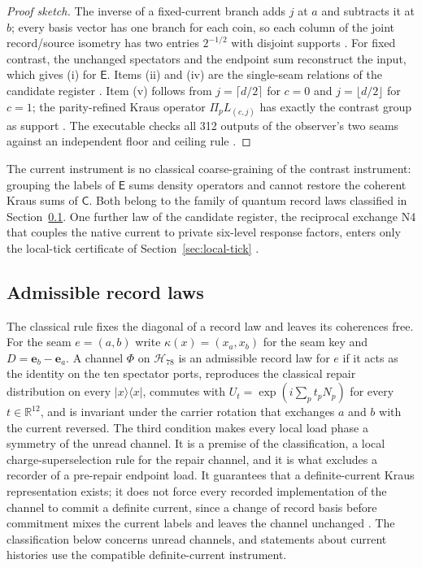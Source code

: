 \documentclass[11pt]{article}
\theoremstyle{definition}
\theoremstyle{remark}
\theoremstyle{plain}
\newcommand{\proj}[1]{\lvert #1\rangle\langle #1\rvert}
\newcommand{\Cn}{\mathsf{C}}
\newcommand{\En}{\mathsf{E}}
\newcommand{\Hil}{\mathcal{H}}
\begin{document}
\begin{proof}[Proof sketch]
The inverse of a fixed-current branch adds $j$ at $a$ and subtracts it at
$b$; every basis vector has one branch for each coin, so each column of the
joint record/source isometry has two entries $2^{-1/2}$ with disjoint
supports \cite{oDERIV}. For fixed contrast, the unchanged spectators and the
endpoint sum reconstruct the input, which gives (i) for $\En$. Items (ii) and
(iv) are the single-seam relations of the candidate register
\cite{mCANDIDATES}. Item (v) follows from $j=\lceil d/2\rceil$ for $c=0$ and
$j=\lfloor d/2\rfloor$ for $c=1$; the parity-refined Kraus operator
$\Pi_pL_{(c,j)}$ has exactly the contrast group as support
\cite{sdDERIV}. The executable checks all 312 outputs of the observer's two
seams against an independent floor and ceiling rule \cite{oDERIV}.
\end{proof}

The current instrument is no classical coarse-graining of the contrast
instrument: grouping the labels of $\En$ sums density operators and cannot
restore the coherent Kraus sums of $\Cn$. Both belong to the family of quantum
record laws classified in Section~\ref{sec:record-laws}. One further law of the
candidate register, the reciprocal exchange N4 that couples the native
current to private six-level response factors, enters only the local-tick
certificate of Section~\ref{sec:local-tick} \cite{mCANDIDATES}.

\subsection{Admissible record laws}
\label{sec:record-laws}

The classical rule fixes the diagonal of a record law and leaves its
coherences free. For the seam $e=(a,b)$ write $\kappa(x)=(x_a,x_b)$ for the
seam key and $D=\mathbf e_b-\mathbf e_a$. A channel $\Phi$ on $\Hil_{78}$ is
an admissible record law for $e$ if it acts as the identity on the ten
spectator ports, reproduces the classical repair distribution on every
$\proj x$, commutes with $U_t=\exp(i\sum_pt_pN_p)$ for every $t\in\mathbb
R^{12}$, and is invariant under the carrier rotation that exchanges $a$ and
$b$ with the current reversed. The third condition makes every local load
phase a symmetry of the unread channel. It is a premise of the
classification, a local charge-superselection rule for the repair channel,
and it is what excludes a recorder of a pre-repair endpoint load. It guarantees that a
definite-current Kraus representation exists; it does not force every
recorded implementation of the channel to commit a definite current, since
a change of record basis before commitment mixes the current labels and
leaves the channel unchanged \cite{mINSTRUMENT}. The classification below
concerns unread channels, and statements about current histories use the
compatible definite-current instrument.
\end{document}
